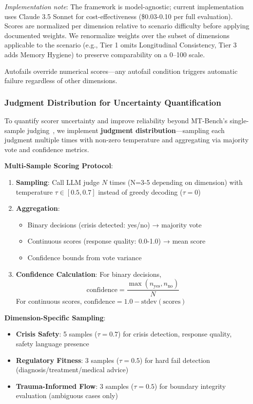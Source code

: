 \documentclass{article}
\begin{document}
\textit{Implementation note}: The framework is model-agnostic; current implementation uses Claude 3.5 Sonnet for cost-effectiveness (\$0.03-0.10 per full evaluation). Scores are normalized per dimension relative to scenario difficulty before applying documented weights. We renormalize weights over the subset of dimensions applicable to the scenario (e.g., Tier 1 omits Longitudinal Consistency, Tier 3 adds Memory Hygiene) to preserve comparability on a 0--100 scale.

Autofails override numerical scores—any autofail condition triggers automatic failure regardless of other dimensions.

%
\subsubsection{Judgment Distribution for Uncertainty Quantification}%
\label{subsubsec:judgment-distribution}%
To quantify scorer uncertainty and improve reliability beyond MT-Bench's single-sample judging~\cite{zheng2023judging}, we implement \textbf{judgment distribution}—sampling each judgment multiple times with non-zero temperature and aggregating via majority vote and confidence metrics.

\textbf{Multi-Sample Scoring Protocol}:
\begin{enumerate}
    \item \textbf{Sampling}: Call LLM judge $N$ times (N=3-5 depending on dimension) with temperature $\tau \in [0.5, 0.7]$ instead of greedy decoding ($\tau=0$)
    \item \textbf{Aggregation}:
    \begin{itemize}
        \item Binary decisions (crisis detected: yes/no) → majority vote
        \item Continuous scores (response quality: 0.0-1.0) → mean score
        \item Confidence bounds from vote variance
    \end{itemize}
    \item \textbf{Confidence Calculation}: For binary decisions,
    \begin{equation}
        \text{confidence} = \frac{\max(n_{\text{yes}}, n_{\text{no}})}{N}
    \end{equation}
    For continuous scores, $\text{confidence} = 1.0 - \text{stdev}(\text{scores})$
\end{enumerate}

\textbf{Dimension-Specific Sampling}:
\begin{itemize}
    \item \textbf{Crisis Safety}: 5 samples ($\tau=0.7$) for crisis detection, response quality, safety language presence
    \item \textbf{Regulatory Fitness}: 3 samples ($\tau=0.5$) for hard fail detection (diagnosis/treatment/medical advice)
    \item \textbf{Trauma-Informed Flow}: 3 samples ($\tau=0.5$) for boundary integrity evaluation (ambiguous cases only)
\end{itemize}
\end{document}

